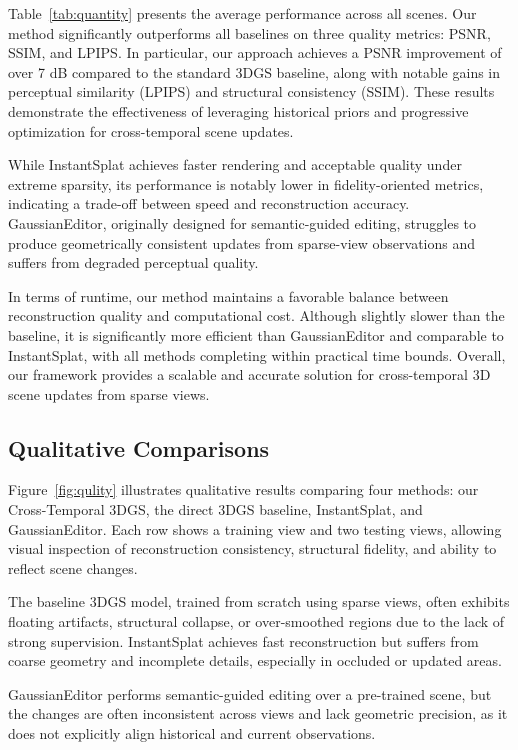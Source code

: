 \documentclass[letterpaper]{article} %
\begin{document}
Table~\ref{tab:quantity} presents the average performance across all scenes. Our method significantly outperforms all baselines on three quality metrics: PSNR, SSIM, and LPIPS. In particular, our approach achieves a PSNR improvement of over 7 dB compared to the standard 3DGS baseline, along with notable gains in perceptual similarity (LPIPS) and structural consistency (SSIM). These results demonstrate the effectiveness of leveraging historical priors and progressive optimization for cross-temporal scene updates.

While InstantSplat achieves faster rendering and acceptable quality under extreme sparsity, its performance is notably lower in fidelity-oriented metrics, indicating a trade-off between speed and reconstruction accuracy. GaussianEditor, originally designed for semantic-guided editing, struggles to produce geometrically consistent updates from sparse-view observations and suffers from degraded perceptual quality.

In terms of runtime, our method maintains a favorable balance between reconstruction quality and computational cost. Although slightly slower than the baseline, it is significantly more efficient than GaussianEditor and comparable to InstantSplat, with all methods completing within practical time bounds. Overall, our framework provides a scalable and accurate solution for cross-temporal 3D scene updates from sparse views.

\subsection{Qualitative Comparisons}

Figure~\ref{fig:qulity} illustrates qualitative results comparing four methods: our Cross-Temporal 3DGS, the direct 3DGS baseline, InstantSplat, and GaussianEditor. Each row shows a training view and two testing views, allowing visual inspection of reconstruction consistency, structural fidelity, and ability to reflect scene changes.

The baseline 3DGS model, trained from scratch using sparse views, often exhibits floating artifacts, structural collapse, or over-smoothed regions due to the lack of strong supervision. InstantSplat achieves fast reconstruction but suffers from coarse geometry and incomplete details, especially in occluded or updated areas.

GaussianEditor performs semantic-guided editing over a pre-trained scene, but the changes are often inconsistent across views and lack geometric precision, as it does not explicitly align historical and current observations.
\end{document}

